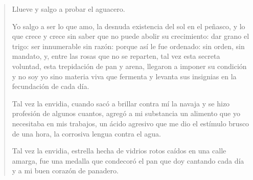 \documentclass[12pt]{article}
\begin{document}
\begin{verse}
Llueve y salgo a probar el aguacero.  

Yo salgo a ser lo que amo, la desnuda  
existencia del sol en el peñasco,  
y lo que crece y crece sin saber  
que no puede abolir su crecimiento:  
dar grano el trigo: ser innumerable  
sin razón: porque así le fue ordenado:  
sin orden, sin mandato,  
y, entre las rosas que no se reparten,  
tal vez esta secreta voluntad,  
esta trepidación de pan y arena,  
llegaron a imponer su condición  
y no soy yo sino materia viva  
que fermenta y levanta sus insignias  
en la fecundación de cada día.  

Tal vez la envidia, cuando  
sacó a brillar contra mí la navaja  
y se hizo profesión de algunos cuantos,  
agregó a mi substancia un alimento  
que yo necesitaba en mis trabajos,  
un ácido agresivo que me dio  
el estímulo brusco de una hora,  
la corrosiva lengua contra el agua.  

Tal vez la envidia, estrella  
hecha de vidrios rotos  
caídos  
en una calle amarga,  
fue una medalla que condecoró  
el pan que doy cantando cada día  
y a mi buen corazón de panadero.  

\end{verse}
\end{document}
